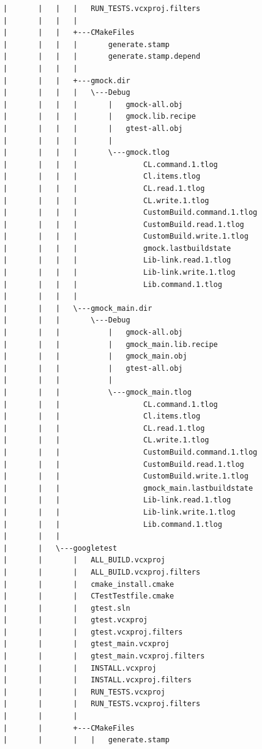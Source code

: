 \documentclass[a4paper,12pt]{article}
\begin{document}
\begin{verbatim}
|       |   |   |   RUN_TESTS.vcxproj.filters
|       |   |   |   
|       |   |   +---CMakeFiles
|       |   |   |       generate.stamp
|       |   |   |       generate.stamp.depend
|       |   |   |       
|       |   |   +---gmock.dir
|       |   |   |   \---Debug
|       |   |   |       |   gmock-all.obj
|       |   |   |       |   gmock.lib.recipe
|       |   |   |       |   gtest-all.obj
|       |   |   |       |   
|       |   |   |       \---gmock.tlog
|       |   |   |               CL.command.1.tlog
|       |   |   |               Cl.items.tlog
|       |   |   |               CL.read.1.tlog
|       |   |   |               CL.write.1.tlog
|       |   |   |               CustomBuild.command.1.tlog
|       |   |   |               CustomBuild.read.1.tlog
|       |   |   |               CustomBuild.write.1.tlog
|       |   |   |               gmock.lastbuildstate
|       |   |   |               Lib-link.read.1.tlog
|       |   |   |               Lib-link.write.1.tlog
|       |   |   |               Lib.command.1.tlog
|       |   |   |               
|       |   |   \---gmock_main.dir
|       |   |       \---Debug
|       |   |           |   gmock-all.obj
|       |   |           |   gmock_main.lib.recipe
|       |   |           |   gmock_main.obj
|       |   |           |   gtest-all.obj
|       |   |           |   
|       |   |           \---gmock_main.tlog
|       |   |                   CL.command.1.tlog
|       |   |                   Cl.items.tlog
|       |   |                   CL.read.1.tlog
|       |   |                   CL.write.1.tlog
|       |   |                   CustomBuild.command.1.tlog
|       |   |                   CustomBuild.read.1.tlog
|       |   |                   CustomBuild.write.1.tlog
|       |   |                   gmock_main.lastbuildstate
|       |   |                   Lib-link.read.1.tlog
|       |   |                   Lib-link.write.1.tlog
|       |   |                   Lib.command.1.tlog
|       |   |                   
|       |   \---googletest
|       |       |   ALL_BUILD.vcxproj
|       |       |   ALL_BUILD.vcxproj.filters
|       |       |   cmake_install.cmake
|       |       |   CTestTestfile.cmake
|       |       |   gtest.sln
|       |       |   gtest.vcxproj
|       |       |   gtest.vcxproj.filters
|       |       |   gtest_main.vcxproj
|       |       |   gtest_main.vcxproj.filters
|       |       |   INSTALL.vcxproj
|       |       |   INSTALL.vcxproj.filters
|       |       |   RUN_TESTS.vcxproj
|       |       |   RUN_TESTS.vcxproj.filters
|       |       |   
|       |       +---CMakeFiles
|       |       |   |   generate.stamp

\end{verbatim}
\end{document}
